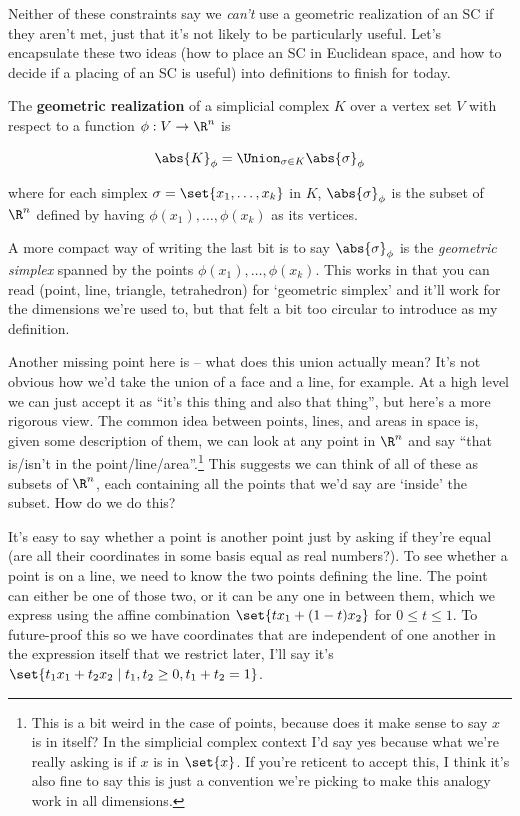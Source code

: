 \documentclass{lec}
\begin{document}
    Neither of these constraints say we \textit{can't} use a geometric realization of an SC if they aren't met, just that it's not likely to be particularly useful. Let's encapsulate these two ideas (how to place an SC in Euclidean space, and how to decide if a placing of an SC is useful) into definitions to finish for today.

    \begin{definition}
        The \textbf{geometric realization} of a simplicial complex $K$ over a vertex set $V$ with respect to a function $\phi: V \to \R^n$ is

        \begin{align*}
            \abs{K}_\phi = \Union_{\sigma \in K} \abs{\sigma}_\phi
        \end{align*}

        where for each simplex $\sigma = \set{x_1, \dots, x_k}$ in $K$, $\abs{\sigma}_\phi$ is the subset of $\R^n$ defined by having $\phi(x_1), \dots, \phi(x_k)$ as its vertices.
    \end{definition}

    A more compact way of writing the last bit is to say $\abs{\sigma}_\phi$ is the \textit{geometric simplex} spanned by the points $\phi(x_1), \dots, \phi(x_k)$. This works in that you can read (point, line, triangle, tetrahedron) for `geometric simplex' and it'll work for the dimensions we're used to, but that felt a bit too circular to introduce as my definition.

    Another missing point here is -- what does this union actually mean? It's not obvious how we'd take the union of a face and a line, for example. At a high level we can just accept it as ``it's this thing and also that thing'', but here's a more rigorous view. The common idea between points, lines, and areas in space is, given some description of them, we can look at any point in $\R^n$ and say ``that is/isn't in the point/line/area''.\footnote{This is a bit weird in the case of points, because does it make sense to say $x$ is in itself? In the simplicial complex context I'd say yes because what we're really asking is if $x$ is in $\set{x}$. If you're reticent to accept this, I think it's also fine to say this is just a convention we're picking to make this analogy work in all dimensions.} This suggests we can think of all of these as subsets of $\R^n$, each containing all the points that we'd say are `inside' the subset. How do we do this?

    It's easy to say whether a point is another point just by asking if they're equal (are all their coordinates in some basis equal as real numbers?). To see whether a point is on a line, we need to know the two points defining the line. The point can either be one of those two, or it can be any one in between them, which we express using the affine combination $\set{tx_1 + (1 - t) x_2}$ for $0 \leq t \leq 1$. To future-proof this so we have coordinates that are independent of one another in the expression itself that we restrict later, I'll say it's $\set{t_1 x_1 + t_2 x_2 \mid t_1, t_2 \geq 0, t_1 + t_2 = 1}$.
\end{document}

